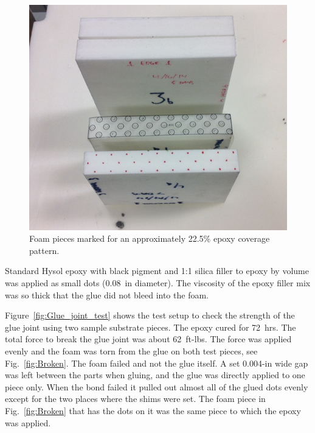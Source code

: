 \begin{figure}[ht]
    \centering
    \includegraphics[width=1.0\linewidth]{images/Pattern.png}
    \caption{Foam pieces marked for an approximately 22.5\% epoxy coverage pattern.}
    \label{fig:Pattern}
\end{figure}

Standard Hysol epoxy with black pigment and 1:1 silica filler to epoxy by volume was applied as small dots
(0.08~in diameter). The viscosity of the epoxy filler mix was so thick that the glue did not bleed into the foam. 

Figure~\ref{fig:Glue_joint_test} shows the test setup to check the strength of the glue joint using two sample
substrate pieces. The epoxy cured for 72~hrs. The total force to break the glue joint was about 62~ft-lbs. The
force was applied evenly and the foam was torn from the glue on both test pieces, see Fig.~\ref{fig:Broken}. The
foam failed and not the glue itself. A set 0.004-in wide gap was left between the parts when gluing, and the glue
was directly applied to one piece only. When the bond failed it pulled out almost all of the glued dots evenly except
for the two places where the shims were set. The foam piece in Fig.~\ref{fig:Broken} that has the dots on it was
the same piece to which the epoxy was applied.

